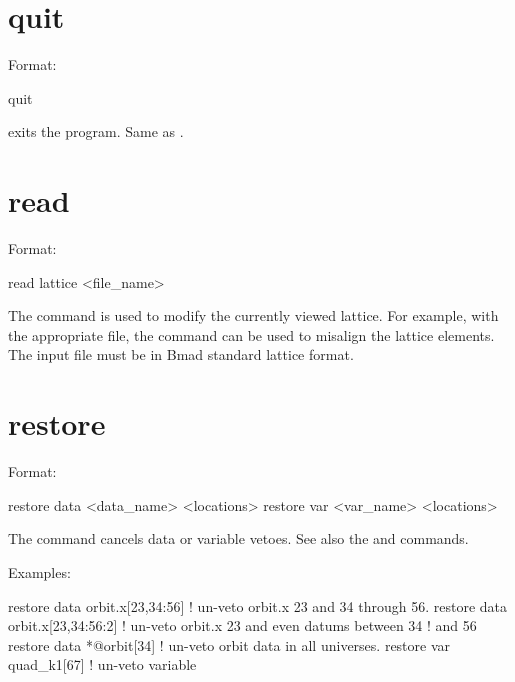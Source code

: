 {{{%
\section{quit}
\label{s:quit}

Format:
\begin{example}
  quit
\end{example}

\vskip 0.2in
 exits the program. Same as .

\section{read}
\label{s:read}

Format:
\begin{example}
  read lattice <file_name>
\end{example}

\vskip 0.2in 
The  command is used to modify the currently
viewed  lattice. For example, with the appropriate file,
the  command can be used to misalign the lattice
elements. The input file must be in Bmad standard lattice format.

\section{restore}
\label{s:restore}

Format:
\begin{example}
  restore data  <data_name> <locations>
  restore var <var_name> <locations>
\end{example}

\vskip 0.2in 
The  command cancels data or variable
vetoes. See also the 
and  commands.

Examples:
\begin{example}
  restore data orbit.x[23,34:56]   ! un-veto orbit.x 23 and 34 through 56.
  restore data orbit.x[23,34:56:2] ! un-veto orbit.x 23 and even datums between 34 
                                   !                                          and 56
  restore data *@orbit[34]         ! un-veto orbit data in all universes.
  restore var quad_k1[67]          ! un-veto variable
\end{example}

}}}
